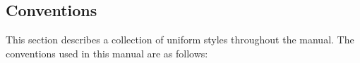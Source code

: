 %
%
\newcommand{\nix}[1]{\texttt{[image: nix.eps]} #1}
\newcommand{\win}[1]{\texttt{[image: win.eps]} #1}
\newcommand{\osx}[1]{\texttt{[image: osx.eps]} #1}
%
\newcommand{\nixcaption}{\protect\texttt{[image: nix.eps]}}
\newcommand{\wincaption}{\protect\texttt{[image: win.eps]}}
\newcommand{\osxcaption}{\protect\texttt{[image: osx.eps]}}


\newcommand{\qtmainmenuopt}[1]{\textsf{#1}}
\newcommand{\qtdropmenuopt}[1]{\textsf{#1}}
\newcommand{\qtdialog}[1]{\textsf{#1}}

 

%
\subsection{Conventions}\label{label_conventions}

This section describes a collection of uniform styles throughout the manual.
The conventions used in this manual are as follows:

